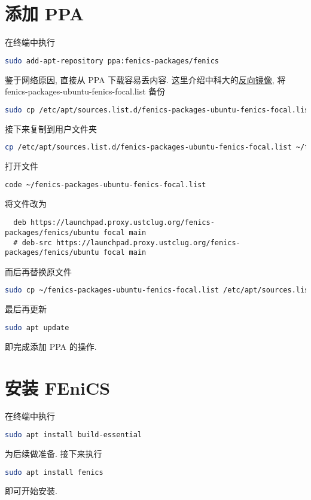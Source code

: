 \documentclass[fontset=founder]{ctexrep}
\begin{document}
\section{添加 PPA}

在终端中执行
\begin{lstlisting}[language = bash]
  sudo add-apt-repository ppa:fenics-packages/fenics
\end{lstlisting}
鉴于网络原因,
直接从 PPA 下载容易丢内容.
这里介绍中科大的\href{https://lug.ustc.edu.cn/wiki/mirrors/help/revproxy/}{反向镜像},
将 \textsf{fenics-packages-ubuntu-fenics-focal.list} 备份
\begin{lstlisting}[language = bash]
  sudo cp /etc/apt/sources.list.d/fenics-packages-ubuntu-fenics-focal.list /etc/apt/sources.list.d/fenics-packages-ubuntu-fenics-focal.list.bak
\end{lstlisting}
接下来复制到用户文件夹
\begin{lstlisting}[language = bash]
  cp /etc/apt/sources.list.d/fenics-packages-ubuntu-fenics-focal.list ~/fenics-packages-ubuntu-fenics-focal.list
\end{lstlisting}
打开文件
\begin{lstlisting}[language = bash]
  code ~/fenics-packages-ubuntu-fenics-focal.list
\end{lstlisting}
将文件改为
\begin{lstlisting}
  deb https://launchpad.proxy.ustclug.org/fenics-packages/fenics/ubuntu focal main
  # deb-src https://launchpad.proxy.ustclug.org/fenics-packages/fenics/ubuntu focal main
\end{lstlisting}
而后再替换原文件
\begin{lstlisting}[language = bash]
  sudo cp ~/fenics-packages-ubuntu-fenics-focal.list /etc/apt/sources.list.d/fenics-packages-ubuntu-fenics-focal.list
\end{lstlisting}
最后再更新
\begin{lstlisting}[language = bash]
  sudo apt update
\end{lstlisting}
即完成添加 PPA 的操作.

\section{安装 FEniCS}

在终端中执行
\begin{lstlisting}[language = bash]
  sudo apt install build-essential
\end{lstlisting}
为后续做准备.
接下来执行
\begin{lstlisting}[language = bash]
  sudo apt install fenics
\end{lstlisting}
即可开始安装.
\end{document}
